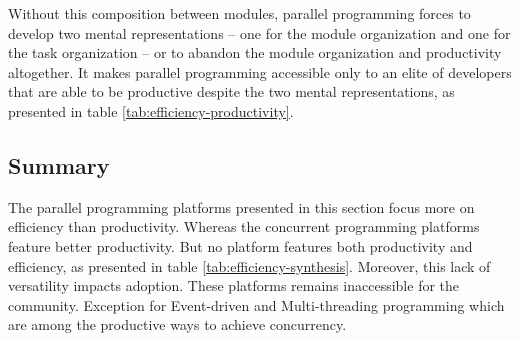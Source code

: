 Without this composition between modules, parallel programming forces to develop two mental representations -- one for the module organization and one for the task organization -- or to abandon the module organization and productivity altogether.
It makes parallel programming accessible only to an elite of developers that are able to be productive despite the two mental representations, as presented in table \ref{tab:efficiency-productivity}.


\subsection{Summary} \label{chapter3:software-efficiency:summary}

The parallel programming platforms presented in this section focus more on efficiency than productivity.
Whereas the concurrent programming platforms feature better productivity.
But no platform features both productivity and efficiency, as presented in table \ref{tab:efficiency-synthesis}.
Moreover, this lack of versatility impacts adoption.
These platforms remains inaccessible for the community.
Exception for Event-driven and Multi-threading programming which are among the productive ways to achieve concurrency.




\endinput

Streaming
\cite{Madsen2015}
\cite{Sun2015}

Map Reduce
\cite{Yao2015}


Web assembly
https://medium.com/javascript-scene/what-is-webassembly-the-dawn-of-a-new-era-61256ec5a8f6